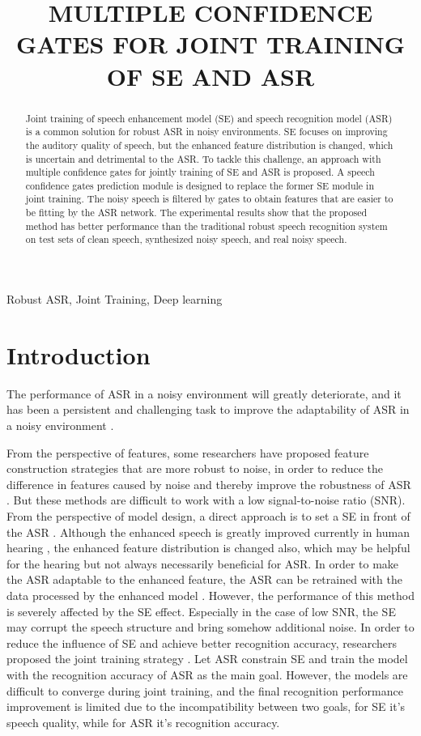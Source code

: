\documentclass{article}
\title{MULTIPLE CONFIDENCE GATES FOR JOINT TRAINING OF SE AND ASR}
\begin{document}
	\maketitle

	\begin{abstract}
		Joint training of speech enhancement model (SE) and speech recognition model (ASR) is a common solution for robust ASR in noisy environments. SE focuses on improving the auditory quality of speech, but the enhanced feature distribution is changed, which is uncertain and detrimental to the ASR. To tackle this challenge, an approach with multiple confidence gates for jointly training of SE and ASR is proposed. A speech confidence gates prediction module is designed to replace the former SE module in joint training. The noisy speech is filtered by gates to obtain features that are easier to be fitting by the ASR network. The experimental results show that the proposed method has better performance than the traditional robust speech recognition system on test sets of clean speech, synthesized noisy speech, and real noisy speech.
	\end{abstract}
	\begin{keywords}
		Robust ASR, Joint Training, Deep learning
	\end{keywords}
	\section{Introduction}
	\label{sec:intro}
	The performance of ASR in a noisy environment will greatly deteriorate, and it has been a persistent and challenging task to improve the adaptability of ASR in a noisy environment \cite{intro1}. 
	
	From the perspective of features, some researchers have proposed feature construction strategies that are more robust to noise, in order to reduce the difference in features caused by noise and thereby improve the robustness of ASR \cite{introfeature1,introfeature2,introfeature3}. But these methods are difficult to work with a low signal-to-noise ratio (SNR). From the perspective of model design, a direct approach is to set a SE in front of the ASR \cite{se2asr1}. Although the enhanced speech is greatly improved currently in human hearing \cite{Nsnet,crn,dccrn,apcsnr}, the enhanced feature distribution is changed also, which may be helpful for the hearing but not always necessarily beneficial for ASR. In order to make the ASR adaptable to the enhanced feature, the ASR can be retrained with the data processed by the enhanced model \cite{se2asr2}. However, the performance of this method is severely affected by the SE effect. Especially in the case of low SNR, the SE may corrupt the speech structure and bring somehow additional noise. In order to reduce the influence of SE and achieve better recognition accuracy, researchers proposed the joint training strategy \cite{introframework}. Let ASR constrain SE and train the model with the recognition accuracy of ASR as the main goal. However, the models are difficult to converge during joint training, and the final recognition performance improvement is limited due to the incompatibility between two goals, for SE it's speech quality, while for ASR it's recognition accuracy.
	
\end{document}
